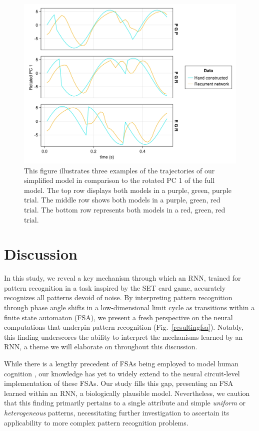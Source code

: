 \documentclass[conference]{IEEEtran}
\begin{document}
\begin{figure}[htbp]
\centerline{\includegraphics[scale=0.10]{constructed_phase_angle_computation.png}}
\caption{This figure illustrates three examples of the trajectories of our simplified model in comparison to the rotated PC 1 of the full model. The top row displays both models in a purple, green, purple trial. The middle row shows both models in a purple, green, red trial. The bottom row represents both models in a red, green, red trial.}
\label{constructedmodel}
\end{figure}

\section{Discussion}

In this study, we reveal a key mechanism through which an RNN, trained for pattern recognition in a task inspired by the SET card game, accurately recognizes all patterns devoid of noise. By interpreting pattern recognition through phase angle shifts in a low-dimensional limit cycle as transitions within a finite state automaton (FSA), we present a fresh perspective on the neural computations that underpin pattern recognition (Fig.~\ref{resultingfsa}). Notably, this finding underscores the ability to interpret the mechanisms learned by an RNN, a theme we will elaborate on throughout this discussion.

While there is a lengthy precedent of FSAs being employed to model human cognition \cite{b26}, our knowledge has yet to widely extend to the neural circuit-level implementation of these FSAs. Our study fills this gap, presenting an FSA learned within an RNN, a biologically plausible model. Nevertheless, we caution that this finding primarily pertains to a single attribute and simple \textit{uniform} or \textit{heterogeneous} patterns, necessitating further investigation to ascertain its applicability to more complex pattern recognition problems.
\end{document}
